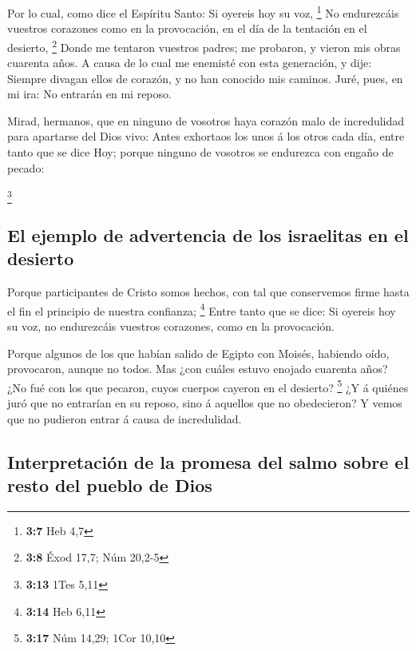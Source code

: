  Por lo cual, como dice el Espíritu Santo: Si oyereis hoy su
voz, \footnote{\textbf{3:7} Heb 4,7}  No endurezcáis
vuestros corazones como en la provocación, en el día de la tentación en
el desierto, \footnote{\textbf{3:8} Éxod 17,7; Núm 20,2-5} 
Donde me tentaron vuestros padres; me probaron, y vieron mis obras
cuarenta años.  A causa de lo cual me enemisté con esta
generación, y dije: Siempre divagan ellos de corazón, y no han conocido
mis caminos.  Juré, pues, en mi ira: No entrarán en mi
reposo.

 Mirad, hermanos, que en ninguno de vosotros haya corazón
malo de incredulidad para apartarse del Dios vivo:  Antes
exhortaos los unos á los otros cada día, entre tanto que se dice Hoy;
porque ninguno de vosotros se endurezca con engaño de pecado:

\footnote{\textbf{3:13} 1Tes 5,11}

\hypertarget{el-ejemplo-de-advertencia-de-los-israelitas-en-el-desierto}{%
\subsection{El ejemplo de advertencia de los israelitas en el
desierto}\label{el-ejemplo-de-advertencia-de-los-israelitas-en-el-desierto}}

 Porque participantes de Cristo somos hechos, con tal que
conservemos firme hasta el fin el principio de nuestra confianza;
\footnote{\textbf{3:14} Heb 6,11}  Entre tanto que se dice:
Si oyereis hoy su voz, no endurezcáis vuestros corazones, como en la
provocación.

 Porque algunos de los que habían salido de Egipto con
Moisés, habiendo oído, provocaron, aunque no todos.  Mas
¿con cuáles estuvo enojado cuarenta años? ¿No fué con los que pecaron,
cuyos cuerpos cayeron en el desierto? \footnote{\textbf{3:17} Núm 14,29;
  1Cor 10,10}  ¿Y á quiénes juró que no entrarían en su
reposo, sino á aquellos que no obedecieron?  Y vemos que no
pudieron entrar á causa de incredulidad.

\hypertarget{interpretaciuxf3n-de-la-promesa-del-salmo-sobre-el-resto-del-pueblo-de-dios}{%
\subsection{Interpretación de la promesa del salmo sobre el resto del
pueblo de
Dios}\label{interpretaciuxf3n-de-la-promesa-del-salmo-sobre-el-resto-del-pueblo-de-dios}}

